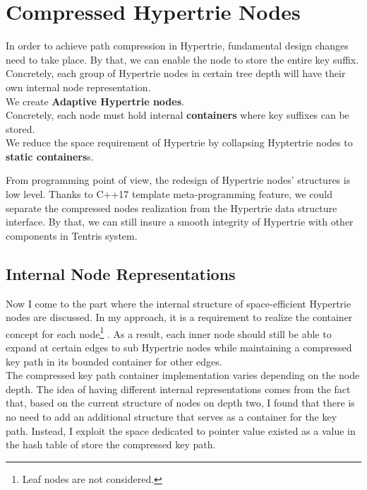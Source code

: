 \section{Compressed Hypertrie Nodes}

In order to achieve path compression in Hypertrie, fundamental design changes need to take place. 
By that, we can enable the node to store the entire key suffix. 
Concretely, each group of Hypertrie nodes in certain tree depth will have their own internal node representation.  \\

We create \textbf{Adaptive Hypertrie nodes}. \\

Concretely, each node must hold internal \textbf{containers} where key suffixes can be stored. \\

We reduce the space requirement of Hypertrie by collapsing Hyptertrie nodes to \textbf{static containers}s. \\


From programming point of view, the redesign of Hypertrie nodes' structures is low level. Thanks to C++17 template meta-programming feature, we could separate the compressed nodes realization from the Hypertrie data structure interface. By that, we can still insure a smooth integrity of Hypertrie with other components in Tentris system. \\

\subsection{Internal Node Representations}

Now I come to the part where the internal structure of space-efficient Hypertrie nodes are discussed. 
In my approach, it is a requirement to realize the container concept for each node\footnote{Leaf nodes are not considered.} . 
As a result, each inner node should still be able to expand at certain edges to sub Hypertrie nodes while maintaining a compressed key path in its bounded container for other edges. \\

The compressed key path container implementation varies depending on the node depth. 
The idea of having different internal representations comes from the fact that, based on the current structure of nodes on depth two, I found that there is no need to add an additional structure that serves as a container for the key path. 
Instead, I exploit the space dedicated to pointer value existed as a value in the hash table of store the compressed key path. \\ 

